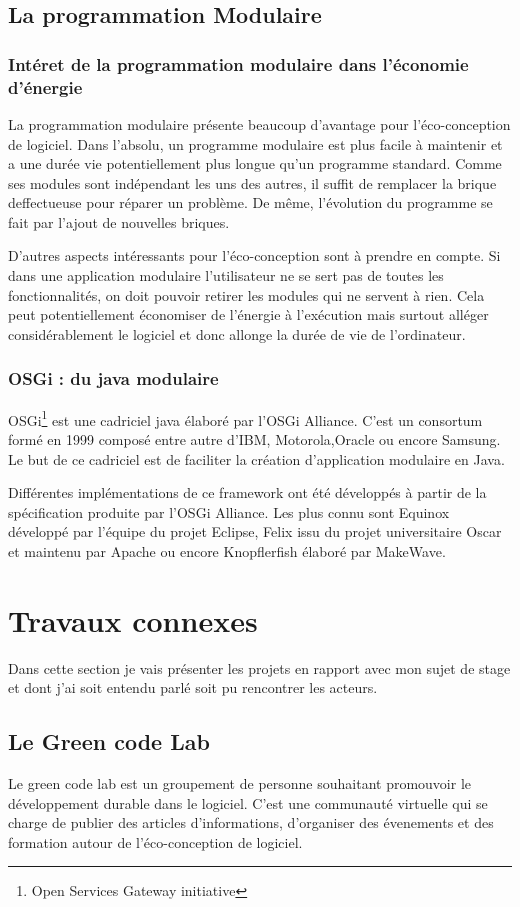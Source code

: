 \documentclass[a4paper, 11pt]{report}
\begin{document}
		\subsection{La programmation Modulaire}
			\subsubsection{Intéret de la programmation modulaire dans l'économie d'énergie}
La programmation modulaire présente beaucoup d'avantage pour l'éco-conception de logiciel. Dans l'absolu, un programme modulaire est plus facile à maintenir et a une durée vie potentiellement plus longue qu'un programme standard. Comme ses modules sont indépendant les uns des autres, il suffit de remplacer la brique deffectueuse pour réparer un problème. De même, l'évolution du programme se fait par l'ajout de nouvelles briques.

D'autres aspects intéressants pour l'éco-conception sont à prendre en compte. Si dans une application modulaire l'utilisateur ne se sert pas de toutes les fonctionnalités, on doit pouvoir retirer les modules qui ne servent à rien. Cela peut potentiellement économiser de l'énergie à l'exécution mais surtout alléger considérablement le logiciel et donc allonge la durée de vie de l'ordinateur.

			\subsubsection{OSGi : du java modulaire}
OSGi\footnote{Open Services Gateway initiative} est une cadriciel java élaboré par l'OSGi Alliance. C'est un consortum formé en 1999 composé entre autre d'IBM, Motorola,Oracle ou encore Samsung. Le but de ce cadriciel est de faciliter la création d'application modulaire en Java. 

Différentes implémentations de ce framework ont été développés à partir de la spécification produite par l'OSGi Alliance. Les plus connu sont Equinox développé par l’équipe du projet Eclipse, Felix issu du projet universitaire Oscar et maintenu par Apache ou encore Knopflerfish élaboré par MakeWave.
		
	\section{Travaux connexes}
Dans cette section je vais présenter les projets en rapport avec mon sujet de stage et dont j'ai soit entendu parlé soit pu rencontrer les acteurs.
		\subsection{Le Green code Lab}
Le green code lab est un groupement de personne souhaitant promouvoir le développement durable dans le logiciel. C'est une communauté virtuelle qui se charge de publier des articles d'informations, d'organiser des évenements et des formation autour de l'éco-conception de logiciel.
\end{document}
